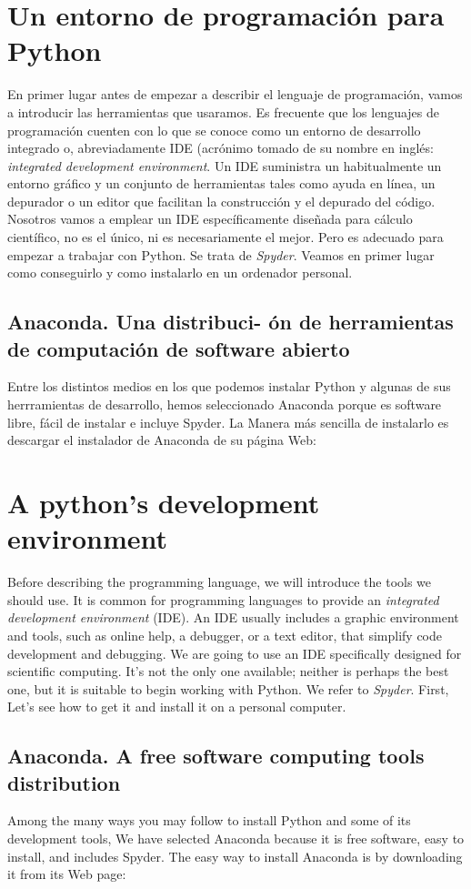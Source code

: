 \begin{paracol}{2}
\section{Un entorno de programación para Python}
En primer lugar antes de empezar a describir el lenguaje de programación, vamos a introducir las herramientas  que usaramos. Es frecuente que los lenguajes de programación cuenten con lo que se conoce como un entorno de desarrollo integrado o, abreviadamente IDE (acrónimo tomado de su nombre en inglés: \emph{integrated development environment}. Un IDE suministra un habitualmente un entorno gráfico y un conjunto de herramientas tales como ayuda en línea, un depurador o un editor que facilitan la construcción y el depurado del código. Nosotros vamos a emplear un IDE específicamente diseñada para cálculo científico, no es el único, ni es necesariamente el mejor. Pero es adecuado para empezar a trabajar con Python. Se trata de \emph{Spyder}. Veamos en primer lugar como conseguirlo y como instalarlo en un ordenador personal.

\subsection{Anaconda. Una distribuci- ón de herramientas de com\-putación de software abierto}
Entre los distintos medios en los que podemos instalar Python y algunas de sus herrramientas de desarrollo, hemos seleccionado Anaconda porque es software libre, fácil de instalar e incluye Spyder. La Manera más sencilla de instalarlo es descargar el instalador de Anaconda de su página Web: 
\switchcolumn
\section{A python's development environment}
Before describing the programming language, we will introduce the tools we should use. It is common for programming languages to provide an \emph{integrated development environment} (IDE). An IDE usually includes a graphic environment and tools, such as online help,  a debugger, or a text editor, that simplify code development and debugging. We are going to use an IDE specifically designed for scientific computing. It's not the only one available; neither is perhaps the best one, but it is suitable to begin working with Python. We refer to \emph{Spyder}. First, Let's see how to get it and install it on a personal computer.

\subsection{Anaconda. A free software computing tools distribution}
Among the many ways you may follow to install Python and some of its development tools, We have selected Anaconda because it is free software, easy to install, and includes Spyder. The easy way to install Anaconda is by downloading it from its Web page:  
\end{paracol}
